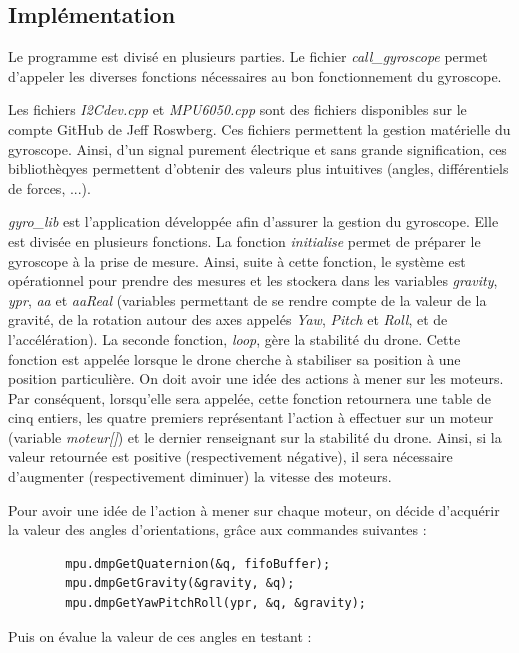 \documentclass[a4paper,10pt]{report}
\begin{document}
	\subsection{Implémentation}
	  Le programme est divisé en plusieurs parties. Le fichier 
\textit{call\_gyroscope} permet d'appeler les diverses fonctions nécessaires au 
bon fonctionnement du gyroscope. 

	  Les fichiers \textit{I2Cdev.cpp} et \textit{MPU6050.cpp} sont des 
fichiers disponibles sur le compte GitHub de Jeff 
Roswberg\cite{jeff_rowberg_lib}. Ces fichiers permettent la gestion matérielle 
du gyroscope. Ainsi, d'un signal purement électrique et sans grande 
signification, ces bibliothèqyes permettent d'obtenir des valeurs plus 
intuitives (angles, différentiels de forces, ...).

	  \textit{gyro\_lib} est l'application développée afin d'assurer la 
gestion du gyroscope. Elle est divisée en plusieurs fonctions. La fonction 
\textit{initialise} permet de préparer le gyroscope à la prise de mesure. 
Ainsi, suite à cette fonction, le système est opérationnel pour prendre des 
mesures et les stockera dans les variables \textit{gravity}, \textit{ypr}, 
\textit{aa} et \textit{aaReal} (variables permettant de se rendre 
compte de la valeur de la gravité, de la rotation autour des axes appelés 
\textit{Yaw}, \textit{Pitch} et \textit{Roll}, et de l'accélération). La 
seconde fonction, \textit{loop},  gère la stabilité du drone. Cette fonction 
est appelée lorsque le drone cherche à stabiliser sa position à une position 
particulière. On doit avoir une idée des actions à mener sur les moteurs. Par 
conséquent, lorsqu'elle sera appelée, cette fonction retournera une table de 
cinq entiers, les quatre premiers représentant l'action à effectuer sur un 
moteur (variable \textit{moteur[]}) et le dernier renseignant sur la stabilité 
du drone. Ainsi, si la valeur retournée est positive (respectivement négative), 
il sera nécessaire d'augmenter (respectivement diminuer) la vitesse des 
moteurs. 

	  Pour avoir une idée de l'action à mener sur chaque moteur, on décide 
d'acquérir la valeur des angles d'orientations, grâce aux commandes suivantes : 

	  \begin{verbatim}
	    mpu.dmpGetQuaternion(&q, fifoBuffer);
	    mpu.dmpGetGravity(&gravity, &q);
	    mpu.dmpGetYawPitchRoll(ypr, &q, &gravity);
	  \end{verbatim}

	  Puis on évalue la valeur de ces angles en testant :
	  
\end{document}

